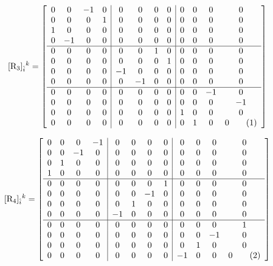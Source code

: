 \documentclass[12pt]{article}
\newcommand\numberthis{\addtocounter{equation}{1}\tag{\theequation}}
\begin{document}
\[
[{\rm R_3}]_{\hat i}{}^{k} = \left[\begin{array}{cccc|cccc|cccc}
    0 & 0 & -1 & 0 & 0 & 0 & 0 & 0 & 0 & 0 & 0 & 0 \\ 
    0 & 0 & 0 & 1 & 0 & 0 & 0 & 0 & 0 & 0 & 0 & 0 \\  
    1 & 0 & 0 & 0 & 0 & 0 & 0 & 0 & 0 & 0 & 0 & 0 \\  
    0 & -1 & 0 & 0 & 0 & 0 & 0 & 0 & 0 & 0 & 0 & 0 \\ 
    \hline
    0 & 0 & 0 & 0 & 0 & 0 & 1 & 0 & 0 & 0 & 0 & 0 \\  
    0 & 0 & 0 & 0 & 0 & 0 & 0 & 1 & 0 & 0 & 0 & 0 \\  
    0 & 0 & 0 & 0 & -1 & 0 & 0 & 0 & 0 & 0 & 0 & 0 \\ 
    0 & 0 & 0 & 0 & 0 & -1 & 0 & 0 & 0 & 0 & 0 & 0 \\ 
    \hline
    0 & 0 & 0 & 0 & 0 & 0 & 0 & 0 & 0 & 0 & -1 & 0 \\ 
    0 & 0 & 0 & 0 & 0 & 0 & 0 & 0 & 0 & 0 & 0 & -1 \\ 
    0 & 0 & 0 & 0 & 0 & 0 & 0 & 0 & 1 & 0 & 0 & 0 \\  
    0 & 0 & 0 & 0 & 0 & 0 & 0 & 0 & 0 & 1 & 0 & 0
\numberthis\end{array}\right] \]

\[
[{\rm R_4}]_{\hat i}{}^{k} = \left[\begin{array}{cccc|cccc|cccc}
    0 & 0 & 0 & -1 & 0 & 0 & 0 & 0 & 0 & 0 & 0 & 0 \\ 
    0 & 0 & -1 & 0 & 0 & 0 & 0 & 0 & 0 & 0 & 0 & 0 \\ 
    0 & 1 & 0 & 0 & 0 & 0 & 0 & 0 & 0 & 0 & 0 & 0 \\  
    1 & 0 & 0 & 0 & 0 & 0 & 0 & 0 & 0 & 0 & 0 & 0 \\  
    \hline
    0 & 0 & 0 & 0 & 0 & 0 & 0 & 1 & 0 & 0 & 0 & 0 \\  
    0 & 0 & 0 & 0 & 0 & 0 & -1 & 0 & 0 & 0 & 0 & 0 \\ 
    0 & 0 & 0 & 0 & 0 & 1 & 0 & 0 & 0 & 0 & 0 & 0 \\  
    0 & 0 & 0 & 0 & -1 & 0 & 0 & 0 & 0 & 0 & 0 & 0 \\ 
    \hline
    0 & 0 & 0 & 0 & 0 & 0 & 0 & 0 & 0 & 0 & 0 & 1 \\  
    0 & 0 & 0 & 0 & 0 & 0 & 0 & 0 & 0 & 0 & -1 & 0 \\ 
    0 & 0 & 0 & 0 & 0 & 0 & 0 & 0 & 0 & 1 & 0 & 0 \\  
    0 & 0 & 0 & 0 & 0 & 0 & 0 & 0 & -1 & 0 & 0 & 0
\numberthis\end{array}\right] \]
\end{document}
